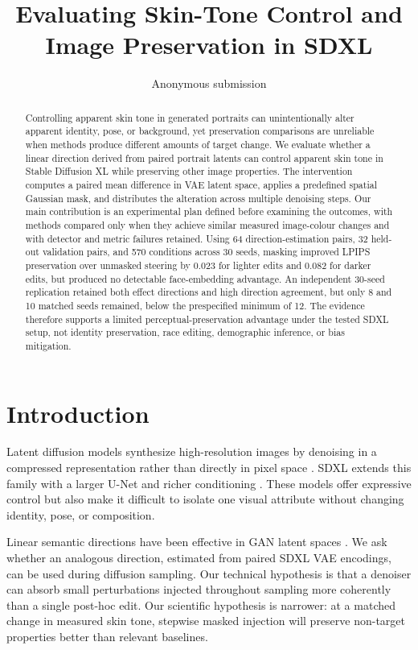 \documentclass[10pt,twocolumn,letterpaper]{article}
\title{Evaluating Skin-Tone Control and Image Preservation in SDXL}
\author{Anonymous submission}
\date{}
\begin{document}
\maketitle

\begin{abstract}
Controlling apparent skin tone in generated portraits can unintentionally
alter apparent identity, pose, or background, yet preservation comparisons are
unreliable when methods produce different amounts of target change. We
evaluate whether a linear direction derived from paired portrait latents can
control apparent skin tone in Stable Diffusion XL while preserving other image
properties. The intervention computes a paired mean difference in VAE latent
space, applies a predefined spatial Gaussian mask, and distributes the
alteration across multiple denoising steps. Our main contribution is an
experimental plan defined before examining the outcomes, with methods compared
only when they achieve similar measured image-colour changes and with detector
and metric failures retained. Using 64 direction-estimation pairs, 32 held-out
validation pairs, and 570 conditions across 30 seeds, masking improved LPIPS
preservation over unmasked steering by 0.023 for lighter edits and 0.082 for
darker edits, but produced no detectable face-embedding advantage. An
independent 30-seed replication retained both effect directions and high
direction agreement, but only 8 and 10 matched seeds remained, below the
prespecified minimum of 12. The evidence therefore supports a limited
perceptual-preservation advantage under the tested SDXL setup, not identity
preservation, race editing, demographic inference, or bias mitigation.
\end{abstract}

\section{Introduction}

Latent diffusion models synthesize high-resolution images by denoising in a
compressed representation rather than directly in pixel space
\cite{rombach2022ldm}. SDXL extends this family with a larger U-Net and richer
conditioning \cite{podell2023sdxl}. These models offer expressive control but
also make it difficult to isolate one visual attribute without changing
identity, pose, or composition.

Linear semantic directions have been effective in GAN latent spaces
\cite{shen2020interfacegan}. We ask whether an analogous direction, estimated
from paired SDXL VAE encodings, can be used during diffusion sampling. Our
technical hypothesis is that a denoiser can absorb small perturbations injected
throughout sampling more coherently than a single post-hoc edit. Our scientific
hypothesis is narrower: at a matched change in measured skin tone, stepwise
masked injection will preserve non-target properties better than relevant
baselines.
\end{document}
